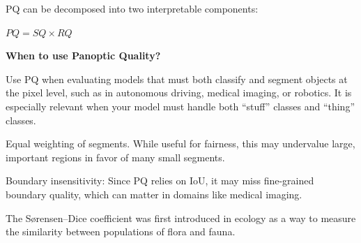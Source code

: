 PQ can be decomposed into two interpretable components:

\begin{center}
    $PQ = SQ \times RQ$
\end{center}

\textbf{When to use Panoptic Quality?}

Use PQ when evaluating models that must both classify and segment objects at the pixel level, such
as in autonomous driving, medical imaging, or robotics. It is especially relevant when your model
must handle both “stuff” classes and “thing” classes.


{
\item Equal weighting of segments. While useful for fairness, this may undervalue large, important regions in favor of many small segments.
\item Boundary insensitivity: Since PQ relies on IoU, it may miss fine-grained boundary quality,
which can matter in domains like medical imaging.
}

\clearpage

\thispagestyle{customstyle}

{The S{\o}rensen–Dice coefficient was first introduced in ecology as a way to measure the similarity
between populations of flora and fauna.}